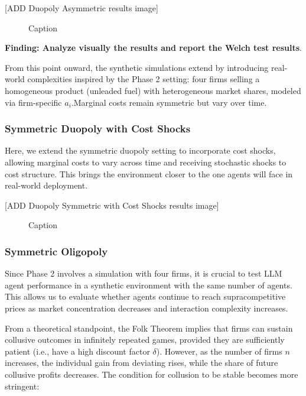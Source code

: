 [ADD Duopoly Asymmetric results image]
\begin{figure}[H]
    \centering
    \caption{Caption}
    \label{fig:enter-label}
\end{figure}
\textbf{Finding: Analyze visually the results and report the Welch test results}.

From this point onward, the synthetic simulations extend \textcite{fish_algorithmic_2025} by introducing real-world complexities inspired by the Phase 2 setting: four firms selling a homogeneous product (unleaded fuel) with heterogeneous market shares, modeled via firm-specific $a_i$.Marginal costs remain symmetric but vary over time.


\subsubsection*{Symmetric Duopoly with Cost Shocks}

Here, we extend the symmetric duopoly setting to incorporate cost shocks, allowing marginal costs to vary across time and receiving stochastic shocks to cost structure. This brings the environment closer to the one agents will face in real-world deployment.

[ADD Duopoly Symmetric with Cost Shocks results image]
\begin{figure}[H]
    \centering
    \caption{Caption}
    \label{fig:enter-label}
\end{figure}


\subsubsection*{Symmetric Oligopoly}

Since Phase 2 involves a simulation with four firms, it is crucial to test LLM agent performance in a synthetic environment with the same number of agents. This allows us to evaluate whether agents continue to reach supracompetitive prices as market concentration decreases and interaction complexity increases.

From a theoretical standpoint, the Folk Theorem implies that firms can sustain collusive outcomes in infinitely repeated games, provided they are sufficiently patient (i.e., have a high discount factor $\delta$). However, as the number of firms $n$ increases, the individual gain from deviating rises, while the share of future collusive profits decreases. The condition for collusion to be stable becomes more stringent:

